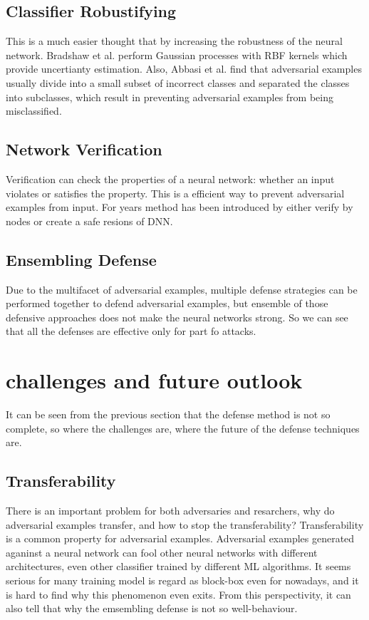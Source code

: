 \documentclass[twoside,twocolumn]{article}
\begin{document}
\subsection{Classifier Robustifying}
This is a much easier thought that by increasing the robustness of the neural network. Bradshaw et al. perform Gaussian processes with RBF kernels which provide uncertianty estimation.  Also, Abbasi et al. find that adversarial examples usually divide into a small subset of incorrect classes and separated the classes into subclasses, which result in preventing adversarial examples from being misclassified.
\subsection{Network Verification}
Verification can check the properties of a neural network: whether an input violates or satisfies the property. This is a efficient way to prevent adversarial examples from input. For years method has been introduced by either verify by nodes or create a safe resions of DNN.
\subsection{Ensembling Defense}
Due to the multifacet of adversarial examples, multiple defense strategies can be performed together to defend adversarial examples, but ensemble of those defensive approaches does not make the neural networks strong. So we can see that all the defenses are effective only for part fo attacks. 

\section{challenges and future outlook}
It can be seen from the previous section that the defense method is not so complete, so where the challenges are, where the future of the defense techniques are. 
\subsection{Transferability}
There is an important problem for both adversaries and resarchers, why do adversarial examples transfer, and how to stop the transferability?
Transferability is a common property for adversarial examples. Adversarial examples generated aganinst a neural network can fool other neural networks with different architectures, even other classifier trained by different ML algorithms. It seems serious for many training model is regard as block-box even for nowadays, and it is hard to find why this phenomenon even exits. From this perspectivity, it can also tell that why the emsembling defense is not so well-behaviour. 
\end{document}
